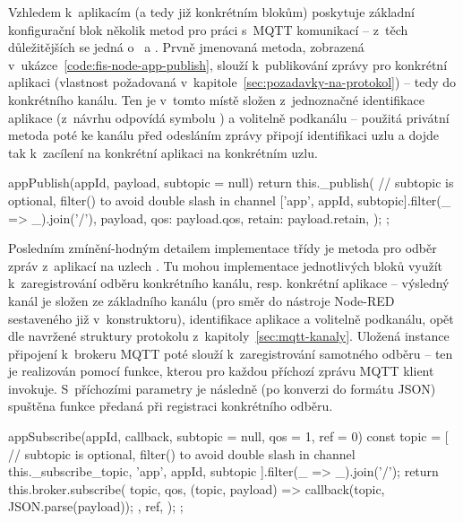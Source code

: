Vzhledem k~aplikacím (a tedy již konkrétním blokům) poskytuje základní konfigurační blok několik metod pro práci
s~MQTT komunikací -- z~těch důležitějších se jedná o~ a .
Prvně jmenovaná metoda, zobrazená v~ukázce~\ref{code:fis-node-app-publish}, slouží k~publikování zprávy pro
konkrétní aplikaci (vlastnost požadovaná v~kapitole~\ref{sec:pozadavky-na-protokol}) -- tedy do konkrétního kanálu.
Ten je v~tomto místě složen z~jednoznačné identifikace aplikace  (z~návrhu odpovídá symbolu ) a
volitelně podkanálu -- použitá privátní metoda  poté ke kanálu před odesláním zprávy připojí identifikaci
uzlu a dojde tak k~zacílení na konkrétní aplikaci na konkrétním uzlu.

\begin{code}[
    language=Javascript,
    label=code:fis-node-app-publish,
    caption={Detail z~implementace třídy \ic{FisNode} -- metoda \ic{appPublish} poskytuje možnost konkrétnímu bloku
    odeslání zprávy do odpovídající aplikace na uzlu, resp. do konkrétního subkanálu.}
]
appPublish(appId, payload, subtopic = null) {
    return this._publish(
        // subtopic is optional, filter() to avoid double slash in channel
        ['app', appId, subtopic].filter(_ => _).join('/'),
        {
            payload,
            qos: payload.qos,
            retain: payload.retain,
        }
    );
};
\end{code}

Posledním zmínění-hodným detailem implementace třídy  je metoda pro odběr zpráv z~aplikací na uzlech
.
Tu mohou implementace jednotlivých bloků využít k~zaregistrování odběru konkrétního kanálu, resp. konkrétní aplikace
-- výsledný kanál je složen ze základního kanálu (pro směr do nástroje Node-RED sestaveného již v~konstruktoru),
identifikace aplikace  a volitelně podkanálu, opět dle navržené struktury protokolu z~kapitoly~\ref{sec:mqtt-kanaly}.
Uložená instance připojení k~brokeru MQTT poté slouží k~zaregistrování samotného odběru -- ten je realizován pomocí
funkce, kterou pro každou příchozí zprávu MQTT klient invokuje.
S~příchozími parametry je následně (po konverzi do formátu JSON) spuštěna funkce předaná při registraci konkrétního
odběru.

\begin{code}[
    language=Javascript,
    label=code:fis-node-app-subscribe,
    caption={Detail z~implementace třídy \ic{FisNode} -- metoda \ic{appSubscribe} je určená k~zaregistrování odběru
    kanálu odpovídajícího konkrétní aplikaci na konkrétním uzlu.
    Parametr \ic{qos} slouží k~nastavení konkrétní hodnoty QoS pro tento odběr, \ic{ref} je volitelná identifikace
    odběru, s~jejíž pomocí lze mazat konkrétní odběry.}
]
appSubscribe(appId, callback, subtopic = null, qos = 1, ref = 0) {
    const topic = [
        // subtopic is optional, filter() to avoid double slash in channel
        this._subscribe_topic, 'app', appId, subtopic
    ].filter(_ => _).join('/');
    return this.broker.subscribe(
        topic,
        qos,
        (topic, payload) => {
            callback(topic, JSON.parse(payload));
        },
        ref,
    );
};
\end{code}

